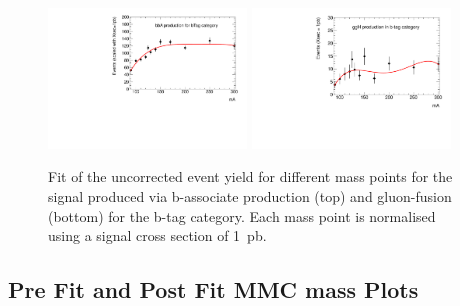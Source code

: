 
\begin{figure}[!hb]
  \centering
  \includegraphics[width=0.47\textwidth]{figure/limits/bbA_regularizzation.pdf}
  \includegraphics[width=0.47\textwidth]{figure/limits/ggH_regularizzation.pdf}
  \caption{Fit of the uncorrected event yield for different mass points for the signal produced via b-associate production (top)
and gluon-fusion (bottom) for the b-tag category. Each mass point is normalised using a signal cross section of 1~pb.}
\label{fig:regularizzation}
\end{figure}

\clearpage
\subsection{Pre Fit and Post Fit MMC mass Plots}

